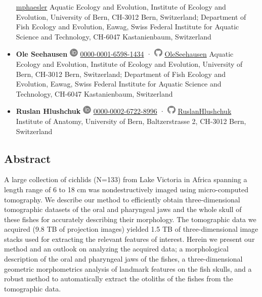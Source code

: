 \begin{itemize}
  \href{https://github.com/mphaesler}{mphaesler}
  Aquatic Ecology and Evolution, Institute of Ecology and Evolution, University of Bern, CH-3012 Bern, Switzerland; Department of Fish Ecology and Evolution, Eawag, Swiss Federal Institute for Aquatic Science and Technology, CH-6047 Kastanienbaum, Switzerland
\item
  \textbf{Ole Seehausen}
  \includegraphics[width=0.16667in,height=0.16667in]{images/orcid.svg}
  \href{https://orcid.org/0000-0001-6598-1434}{0000-0001-6598-1434} ·
  \includegraphics[width=0.16667in,height=0.16667in]{images/github.svg}
  \href{https://github.com/OleSeehausen}{OleSeehausen}
  Aquatic Ecology and Evolution, Institute of Ecology and Evolution, University of Bern, CH-3012 Bern, Switzerland; Department of Fish Ecology and Evolution, Eawag, Swiss Federal Institute for Aquatic Science and Technology, CH-6047 Kastanienbaum, Switzerland
\item
  \textbf{Ruslan Hlushchuk}
  \includegraphics[width=0.16667in,height=0.16667in]{images/orcid.svg}
  \href{https://orcid.org/0000-0002-6722-8996}{0000-0002-6722-8996} ·
  \includegraphics[width=0.16667in,height=0.16667in]{images/github.svg}
  \href{https://github.com/RuslanHlushchuk}{RuslanHlushchuk}
  Institute of Anatomy, University of Bern, Baltzerstrasse 2, CH-3012 Bern, Switzerland
\end{itemize}

\hypertarget{abstract}{%
\subsection{Abstract}\label{abstract}}

A large collection of cichlids (N=133) from Lake Victoria in Africa spanning a length range of 6 to 18 cm was nondestructively imaged using micro-computed tomography.
We describe our method to efficiently obtain three-dimensional tomographic datasets of the oral and pharyngeal jaws and the whole skull of these fishes for accurately describing their morphology.
The tomographic data we acquired (9.8 TB of projection images) yielded 1.5 TB of three-dimensional image stacks used for extracting the relevant features of interest.
Herein we present our method and an outlook on analyzing the acquired data; a morphological description of the oral and pharyngeal jaws of the fishes, a three-dimensional geometric morphometrics analysis of landmark features on the fish skulls, and a robust method to automatically extract the otoliths of the fishes from the tomographic data.

